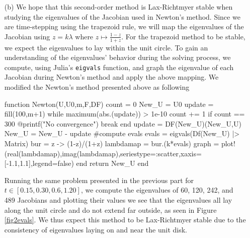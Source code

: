 \documentclass[12pt]{report}
\begin{document}
\begin{solution}
\begin{enumerate}
        \item [(b)]
        We hope that this second-order method is Lax-Richtmyer stable when studying the eigenvalues of the Jacobian used in Newton's method. Since we are time-stepping using the trapezoid rule, we will map the eigenvalues of the Jacobian using $z=k\lambda$ where $z \mapsto  \frac{1-z}{1+z}$. For the trapezoid method to be stable, we expect the eigenvalues to lay within the unit circle. To gain an understanding of the eigenvalues' behavior during the solving process, we compute, using Julia's \verb+eigvals+ function, and graph the eigenvalue of each Jacobian during Newton's method and apply the above mapping. We modified the Newton's method presented above as following
        \begin{python}
function Newton(U,U0,m,F,DF)
    count = 0
    New_U = U0
    update = fill(100,m+1)
    while maximum(abs.(update)) > 1e-10
        count += 1
        if count == 300
            @printf("No convergence")
        break
        end
        update = DF(New_U)\F(New_U,U)
        New_U = New_U - update
        #compute evals
        evals = eigvals(Df(New_U) |> Matrix)
        bur = z -> (1-z)/(1+z)
        lambdamap = bur.(k*evals)
        graph = plot!(real(lambdamap),imag(lambdamap),seriestype=:scatter,xaxis=[-1.1,1.1],legend=false)
    end
    return New_U
end
        \end{python}
        Running the same problem presented in the previous part for $t\in[0.15,0.30,0.6,1.20]$, we compute the eigenvalues of 60, 120, 242, and 489 Jacobians and plotting their values we see that the eigenvalues all lay along the unit circle and do not extend far outside, as seen in Figure \ref{fig2evals}. We thus expect this method to be Lax-Richtmyer stable due to the consistency of eigenvalues laying on and near the unit disk.
        

\end{enumerate}
\end{solution}
\end{document}
